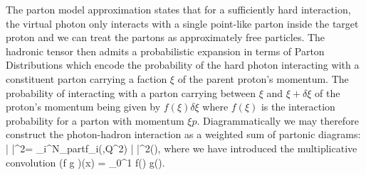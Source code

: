 The parton model approximation states that for a sufficiently hard interaction, the virtual photon only interacts with a single point-like parton inside the target proton and we can treat the partons as approximately free particles. The hadronic tensor then admits a probabilistic expansion in terms of Parton Distributions which encode the probability of the hard photon interacting with a constituent parton carrying a faction $\xi$ of the parent proton's momentum. The probability of interacting with a parton carrying between $\xi$ and $\xi+\delta\xi$ of the proton's momentum being given by $f(\xi)\delta\xi$ where $f(\xi)$ is the interaction probability for a parton with momentum $\xi p$. Diagrammatically we may therefore construct the photon-hadron interaction as a weighted sum of partonic diagrams:
\be \left|  \right|^2= \sum_i^{N_{part}}f_i(\xi,Q^2) \otimes \left| \right|^2(\xi), \nonumber\ee
where we have introduced the multiplicative convolution
\be (f \otimes g )(x) = \int_0^1\; \; f\left(\right) g(\xi).\ee

